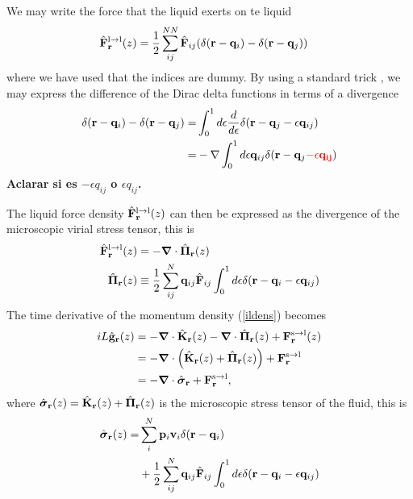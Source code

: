\documentclass[a4paper,openright,12pt]{book}
\newcommand{\Note}[1]{{\bf \color{red}#1}}    %
\begin{document}
We may write the force that the liquid exerts on te liquid 
\begin{align}
  \hat{\bf F}^{\rm l\to l}_{\bf r}(z) &= \frac{1}{2}\sum^{NN}_{ij}\hat{\bf F}_{ij}
(\delta({\bf r}-{\bf q}_i)-\delta({\bf r}-{\bf q}_j))
\end{align}
where we  have used that  the indices are  dummy. By using  a standard
trick \cite{Schofield1982,Grabert1982}, we  may express the difference
of the Dirac delta functions in terms of a divergence
\begin{align}
\delta({\bf r}-{\bf q}_i)-\delta({\bf r}-{\bf q}_j)
=&\int_0^1d\epsilon\frac{d}{d\epsilon}
\delta({\bf r}-{\bf q}_j-\epsilon{\bf q}_{ij})
\nonumber\\
=&-\nabla\int_0^1d\epsilon{\bf q}_{ij}
    \delta({\bf r}-{\bf q}_j\Note{-\epsilon{\bf q}_{ij}})
\nonumber\\
\label{trick}
\end{align}
\Note{Aclarar si es $-\epsilon q_{ij}$ o $\epsilon q_{ij}$.}

The liquid  force density  $\hat{\bf F}^{\rm  l\to l}_{\bf  r}(z)$ can
then be expressed  as the divergence of the  microscopic virial stress
tensor, this is
\begin{align}
\hat{\bf F}^{\rm l\to l}_{\bf r}(z)&=-\boldsymbol{\nabla}\cdot \hat{\boldsymbol{\Pi}}_{\bf r}(z)
\nonumber\\
\hat{\boldsymbol{\Pi}}_{\bf r}(z)&\equiv \frac{1}{2}\sum^{N}_{ij}{\bf q}_{ij}\hat{\bf F}_{ij}
\int_0^{1}d\epsilon\delta({\bf r}-{\bf q}_i-\epsilon{\bf q}_{ij})
\label{micfluxes}
\end{align}
The time derivative of the momentum density (\ref{ildens}) becomes
\begin{align}
    iL\hat{\bf g}_{\bf r}(z)
    &=-\boldsymbol{\nabla}\cdot \hat{{\bf K}}_{\bf r}(z) - \boldsymbol{\nabla}\cdot \hat{{\bf     \Pi}}_{\bf r}(z) +  {\bf F}^{\rm s\to l}_{\bf r}(z) \nonumber \\
    &= -\boldsymbol{\nabla}\cdot\left(\hat{{\bf K}}_{\bf r}(z)+\hat{{\bf \Pi}}_{\bf r}(z)\right) +{\bf F}^{\rm s\to l}_{\bf r} \nonumber \\
    &=-\boldsymbol{\nabla}\cdot \hat{\boldsymbol{\sigma}}_{\bf r}+{\bf F}^{\rm s\to l}_{\bf r},
\label{gls}
\end{align}
where     $\hat{\boldsymbol{\sigma}}_{\bf r}(z)=\hat{{\bf K}}_{\bf
r}(z)+\hat{\boldsymbol{\Pi}}_{\bf r}(z)$  is the microscopic stress
tensor of the fluid, this is
\begin{align}
  \hat{\boldsymbol{\sigma}}_{\bf r}(z)=&
\sum^{N}_i{\bf p}_i{\bf v}_i
\delta({\bf r}-{\bf q}_i)\nonumber\\
&+
\frac{1}{2}\sum^{N}_{ij}{\bf q}_{ij}\hat{\bf F}_{ij}
\int_0^{1}d\epsilon\delta({\bf r}-{\bf q}_i-\epsilon{\bf q}_{ij})
\label{sigma}
\end{align}
\end{document}
